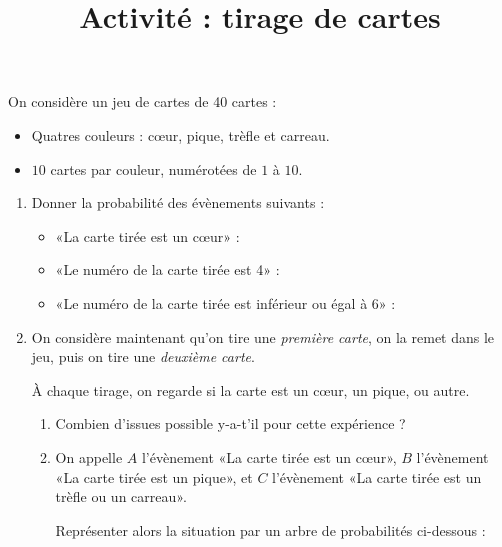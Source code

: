 \documentclass[
	classe=$1^{ere}STI2D$
]{exercice}
\title{Activité : tirage de cartes}
\begin{document}
\maketitle

On considère un jeu de cartes de 40 cartes :
\begin{itemize}
	\item Quatres couleurs : cœur, pique, trèfle et carreau.
	\item $10$ cartes par couleur, numérotées de $1$ à $10$.
\end{itemize}

\begin{enumerate}
	\item Donner la probabilité des évènements suivants :
	      \begin{itemize}
		      \item «La carte tirée est un cœur» : 
		      \item «Le numéro de la carte tirée est 4» : 
		      \item «Le numéro de la carte tirée est inférieur ou égal à 6» : 
	      \end{itemize}
	\item On considère maintenant qu'on tire une \textit{première carte}, on la remet dans le jeu, puis on tire une \textit{deuxième carte}.

	      À chaque tirage, on regarde si la carte est un cœur, un pique, ou autre.
	      \begin{enumerate}
		      \item Combien d'issues possible y-a-t'il pour cette expérience ? 
		      \item On appelle $A$ l'évènement «La carte tirée est un cœur», $B$ l'évènement «La carte tirée est un pique», et $C$ l'évènement «La carte tirée est un trèfle ou un carreau».

		            Représenter alors la situation par un arbre de probabilités ci-dessous :


\end{enumerate}
\end{enumerate}
\end{document}
